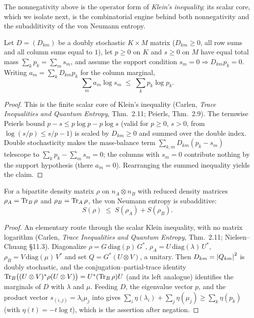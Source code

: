 The nonnegativity above is the operator form of \emph{Klein's inequality}; its scalar core, which
we isolate next, is the combinatorial engine behind both nonnegativity and the subadditivity of
the von Neumann entropy.

\begin{theorem}\label{klein_scalar}
  \leanok
  Let \(D = (D_{km})\) be a doubly stochastic \(K\times M\) matrix (\(D_{km}\ge 0\), all row sums
  and all column sums equal to \(1\)), let \(p\ge 0\) on \(K\) and \(s\ge 0\) on \(M\) have equal
  total mass \(\sum_k p_k = \sum_m s_m\), and assume the support condition
  \(s_m = 0\Rightarrow D_{km}p_k = 0\). Writing \(a_m = \sum_k D_{km}p_k\) for the column
  marginal,
  \[
    \sum_m a_m\log s_m \;\le\; \sum_k p_k\log p_k.
  \]
\end{theorem}
\begin{proof}\leanok
  This is the finite scalar core of Klein's inequality (Carlen, \emph{Trace Inequalities and
  Quantum Entropy}, Thm.~2.11; Peierls, Thm.~2.9). The termwise Peierls bound \(p - s\le p\log p - p\log s\) (valid for
  \(p\ge 0\), \(s > 0\), from \(\log(s/p)\le s/p - 1\)) is scaled by \(D_{km}\ge 0\) and summed
  over the double index. Double stochasticity makes the mass-balance term
  \(\sum_{k,m} D_{km}(p_k - s_m)\) telescope to \(\sum_k p_k - \sum_m s_m = 0\); the columns with
  \(s_m = 0\) contribute nothing by the support hypothesis (there \(a_m = 0\)). Rearranging the
  summed inequality yields the claim.
\end{proof}

\begin{theorem}\label{vonNeumannEntropy_subadditive}
  \leanok
  For a bipartite density matrix \(\rho\) on \(n_A\otimes n_B\) with reduced density matrices
  \(\rho_A = \operatorname{Tr}_B\rho\) and \(\rho_B = \operatorname{Tr}_A\rho\), the von Neumann entropy is subadditive:
  \[
    S(\rho) \;\le\; S(\rho_A) + S(\rho_B).
  \]
\end{theorem}
\begin{proof}\leanok
  An elementary route through the scalar Klein inequality, with no matrix logarithm (Carlen,
  \emph{Trace Inequalities and Quantum Entropy}, Thm.~2.11; Nielsen--Chuang \S11.3). Diagonalize
  \(\rho = G\,\mathrm{diag}(p)\,G^{*}\), \(\rho_A = U\,\mathrm{diag}(\lambda)\,U^{*}\),
  \(\rho_B = V\,\mathrm{diag}(\mu)\,V^{*}\) and set \(Q = G^{*}(U\otimes V)\), a unitary. Then
  \(D_{km} = \left\lvert Q_{km} \right\rvert^2\) is doubly stochastic, and the conjugation--partial-trace identity
  \(\operatorname{Tr}_B\bigl((U\otimes V)^{*}\rho(U\otimes V)\bigr) = U^{*}(\operatorname{Tr}_B\rho)U\) (and its left analogue)
  identifies the marginals of \(D\) with \(\lambda\) and \(\mu\). Feeding \(D\), the eigenvalue
  vector \(p\), and the product vector \(s_{(i,j)} = \lambda_i\mu_j\) into 
  gives \(\sum_i\eta(\lambda_i) + \sum_j\eta(\mu_j)\ge\sum_k\eta(p_k)\) (with \(\eta(t) = -t\log t\)),
  which is the assertion after negation.
\end{proof}

